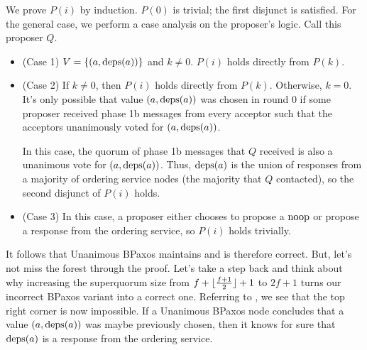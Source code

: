 We prove $P(i)$ by induction. $P(0)$ is trivial; the first disjunct is
satisfied. For the general case, we perform a case analysis on the proposer's
logic. Call this proposer $Q$.
\begin{itemize}
  \item (Case 1)
    $V = \{(a, \text{deps}(a))\}$ and $k \neq 0$. $P(i)$ holds directly from
    $P(k)$.

  \item (Case 2)
    If $k \neq 0$, then $P(i)$ holds directly from $P(k)$. Otherwise, $k = 0$.
    It's only possible that value $(a, \text{deps}(a))$ was chosen in round $0$ if
    some proposer received phase 1b messages from every acceptor such that the
    acceptors unanimously voted for $(a, \text{deps}(a))$.

    In this case, the quorum of phase 1b messages that $Q$ received is also a
    unanimous vote for $(a, \text{deps}(a))$.  Thus, $\text{deps}(a)$ is the union of
    responses from a majority of ordering service nodes (the majority that $Q$
    contacted), so the second disjunct of $P(i)$ holds.

  \item (Case 3)
    In this case, a proposer either chooses to propose a $\text{noop}$ or propose a
    response from the ordering service, so $P(i)$ holds trivially.
\end{itemize}

It follows that Unanimous BPaxos maintains  and is
therefore correct. But, let's not miss the forest through the proof. Let's take
a step back and think about why increasing the superquorum size from $f +
\lfloor\frac{f+1}{2}\rfloor + 1$ to $2f+1$ turns our incorrect BPaxos variant into a
correct one. Referring to , we see that the top right
corner is now impossible. If a Unanimous BPaxos node concludes that a value
$(a, \text{deps}(a))$ was maybe previously chosen, then it knows for sure that
$\text{deps}(a)$ is a response from the ordering service.
